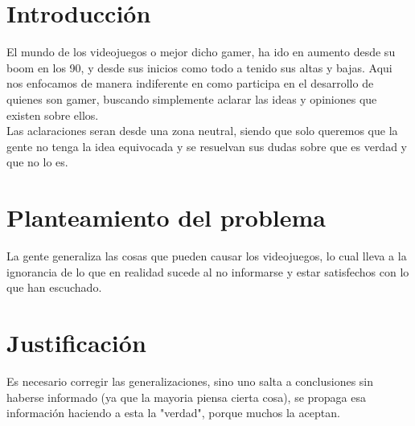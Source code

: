 \documentclass{bmcart}
\begin{document}


\section*{Introducción}
El mundo de los videojuegos o mejor dicho gamer, ha ido en aumento desde su boom en los 90, y desde sus inicios como todo a tenido sus altas y bajas. Aqui nos enfocamos de manera indiferente en como participa en el desarrollo de quienes son gamer, buscando simplemente aclarar las ideas y opiniones que existen sobre ellos.\\
Las aclaraciones seran desde una zona neutral, siendo que solo queremos que la gente no tenga la idea equivocada y se resuelvan sus dudas sobre que es verdad y que no lo es.

\section*{Planteamiento del problema}
La gente generaliza las cosas que pueden causar los videojuegos, lo cual lleva a la ignorancia de lo que en realidad sucede al no informarse y estar satisfechos con lo que han escuchado.

\section*{Justificación}
Es necesario corregir las generalizaciones, sino uno salta a conclusiones sin haberse informado (ya que la mayoria piensa cierta cosa), se propaga esa información haciendo a esta la "verdad", porque muchos la aceptan.
\end{document}
